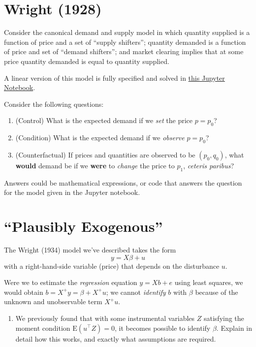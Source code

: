 \documentclass[12pt]{amsart}
\newcommand{\T}{\top}
\begin{document}
\section{Wright (1928)}
\label{sec:org4238d3e}
\nocite{wright1928}
  Consider the canonical demand and supply model in which quantity
  supplied is a function of price and a set of ``supply shifters'';
  quantity demanded is a function of price and set of ``demand
  shifters''; and market clearing implies that at some price quantity
  demanded is equal to quantity supplied.

A linear version of this model is fully specified and solved in
\href{http://datahub.berkeley.edu/user-redirect/interact?account=ligonteaching\&repo=ARE212\_Materials\&branch=master\&path=wright34.ipynb}{this Jupyter Notebook}.

Consider the following questions:

\begin{enumerate}
\item (Control) What is the expected demand if we \emph{set} the price \(p=p_0\)?
\item (Condition) What is the expected demand if we \emph{observe} \(p=p_0\)?
\item (Counterfactual) If prices and quantities are observed to be
\((p_0,q_0)\), what \textbf{would} demand be if we \textbf{were} to \emph{change} the
 price to \(p_1\), \emph{ceteris paribus}?
\end{enumerate}

Answers could be mathematical expressions, or code that answers the
question for the model given in the Jupyter notebook.
\section{``Plausibly Exogenous''}
\label{sec:org452eadf}

The Wright (1934) model we've described takes the form
\begin{equation}
   y = X\beta + u
\end{equation}
with a right-hand-side variable (price) that depends on the
disturbance \(u\).

Were we to estimate the \emph{regression} equation \(y = Xb + e\) using least
squares, we would obtain \(b=X^+y = \beta + X^+u\); we cannot \emph{identify} \(b\)
with \(\beta\) because of the unknown and unobservable term \(X^+u\).

\begin{enumerate}
\item We previously found that with some instrumental variables \(Z\)
satisfying the moment condition \(\mbox{E}(u^\T Z)=0\), it becomes possible
to identify \(\beta\).  Explain in detail how this works, and exactly
what assumptions are required.
\end{enumerate}
\end{document}
